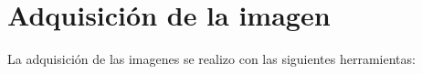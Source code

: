\documentclass[a4paper, 11pt]{article}
\begin{document}













\section{Adquisición de la imagen}

La adquisición de las imagenes se realizo con las siguientes herramientas:
\end{document}
